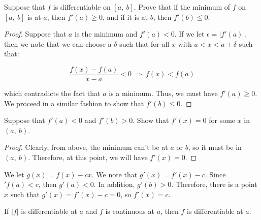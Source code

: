 \documentclass[10pt, oneside]{amsart}
\newenvironment{problem}[2][Problem]{\begin{trivlist}
\item[\hskip \labelsep {\bfseries #1}\hskip \labelsep {\bfseries #2.}]}{\end{trivlist}}
\begin{document}
    \begin{problem}{11.54a}
      Suppose that $f$ is differentiable on $[a, \ b]$. Prove that if the minimum of $f$ on $[a, \ b]$ is at $a$, then $f'(a) \geq 0$, and if it is at $b$, then $f'(b) \leq 0$.
    \end{problem}

    \begin{proof}
      Suppose that $a$ is the minimum and $f'(a) < 0$. If we let $\epsilon = |f'(a)|$, then we note that we can choose a $\delta$ such that for all $x$ with $a < x < a + \delta$
      such that:

      $$\frac{f(x) - f(a)}{x - a} < 0 \ \Rightarrow \ f(x) < f(a)$$

      which contradicts the fact that $a$ is a minimum. Thus, we must have $f'(a) \geq 0$. We proceed in a similar fashion to show that $f'(b) \leq 0$.
    \end{proof}

    \begin{problem}{11.54b}
      Suppose that $f'(a) < 0$ and $f'(b) > 0$. Show that $f'(x) = 0$ for some $x$ in $(a, \ b)$.
    \end{problem}

    \begin{proof}
      Clearly, from above, the minimum can't be at $a$ or $b$, so it must be in $(a, \ b)$. Therefore, at this point, we will have $f'(x) = 0$.
    \end{proof}

    \begin{problem}{11.54c}
      We let $g(x) = f(x) - cx$. We note that $g'(x) = f'(x) - c$. Since $'f(a) < c$, then $g'(a) < 0$. In addition, $g'(b) > 0$. Therefore, there is a point $x$
      such that $g'(x) = f'(x) - c = 0$, so $f'(x) = c$.
    \end{problem}

    \begin{problem}{11.56}
      If $|f|$ is differentiable at $a$ and $f$ is continuous at $a$, then $f$ is differentiable at $a$.
    \end{problem}
\end{document}
